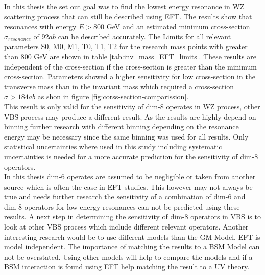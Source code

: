 \documentclass[../Bachelorarbeit.tex]{subfiles}
\begin{document}
In this thesis the set out goal was to find the lowest energy resonance in WZ scattering process that can still be described using EFT.
The results show that resonances with energy $E>800$ GeV and an estimated minimum cross-section $\sigma_{resonance}$ of $92 ab$ can be described accurately.
The Limits for all relevant parameters S0, M0, M1, T0, T1, T2 for the research mass points with greater than 800 GeV are shown in table \ref{tab:inv_mass_EFT_limits}.
These results are independent of the cross-section if the cross-section is greater than the minimum cross-section. Parameters showed a higher sensitivity for low cross-section
in the transverse mass than in the invariant mass which required a cross-section $\sigma>184 ab$ as shon in figure \ref{fig:corss-section-comparission}.\\
This result is only valid for the sensitivity of dim-8 operates in WZ process, other VBS process may produce a different result.
As the results are highly depend on binning further research with different binning depending on the resonance energy may be necessary since the same binning was used for all results.
Only statistical uncertainties where used in this study including systematic uncertainties is needed for a more accurate prediction for the sensitivity of dim-8 operators.\\
In this thesis dim-6 operates are assumed to be negligible or taken from another source which is often the case in EFT studies.
This however may not always be true and needs further research the sensitivity of a combination of dim-6 and dim-8 operators for low energy resonances can not be predicted using these results.
A next step in determining the sensitivity of dim-8 operators in VBS is to look at other VBS process which include different relevant operators.
Another interesting research would be to use different models than the GM Model. EFT is model independent. The importance of matching the results to a BSM Model can not be overstated.
Using other models will help to compare the models and if a BSM interaction is found using EFT help matching the result to a UV theory.
\end{document}
